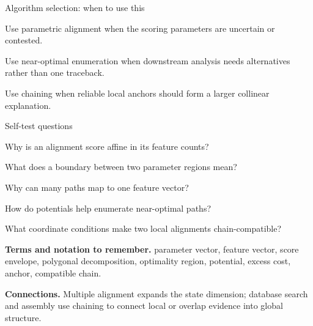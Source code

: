 \documentclass[11pt,letterpaper]{article}
\begin{document}
\begin{CornellOverviewBox}{Algorithm selection: when to use this}
\begin{CornellChecklist}
  \item Use parametric alignment when the scoring parameters are uncertain or contested.
  \item Use near-optimal enumeration when downstream analysis needs alternatives rather than one traceback.
  \item Use chaining when reliable local anchors should form a larger collinear explanation.
\end{CornellChecklist}
\end{CornellOverviewBox}

\begin{CornellExamBox}{Self-test questions}
\begin{CornellRecallList}
  \item Why is an alignment score affine in its feature counts?
  \item What does a boundary between two parameter regions mean?
  \item Why can many paths map to one feature vector?
  \item How do potentials help enumerate near-optimal paths?
  \item What coordinate conditions make two local alignments chain-compatible?
\end{CornellRecallList}
\end{CornellExamBox}

{\footnotesize
\textbf{Terms and notation to remember.} parameter vector, feature vector, score envelope, polygonal decomposition, optimality region, potential, excess cost, anchor, compatible chain.

\textbf{Connections.} Multiple alignment expands the state dimension; database search and assembly use chaining to connect local or overlap evidence into global structure.
}
\end{document}
